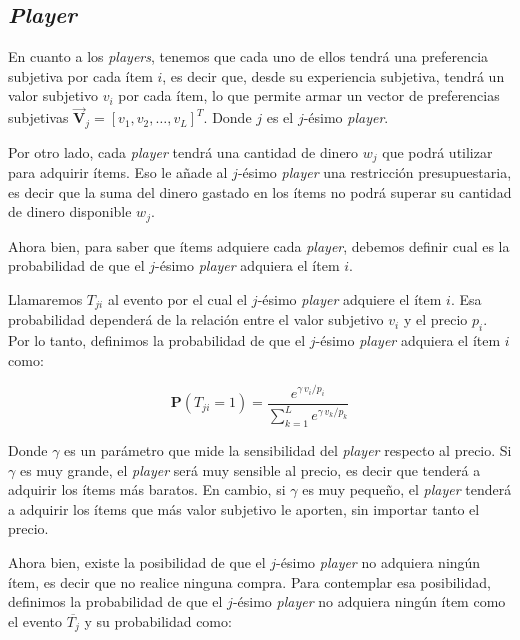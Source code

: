 \subsection{\textit{Player}}
\vspace{0.25cm}

En cuanto a los \textit{players}, tenemos que cada uno de ellos tendrá una preferencia subjetiva por cada ítem $i$, es
decir que, desde su experiencia subjetiva, tendrá un valor subjetivo $v_i$ por cada ítem, lo que permite armar un
vector de preferencias subjetivas $\vec{\mathbf{V}}_j = [v_1, v_2, \ldots, v_L]^T$. Donde $j$ es el $j$-ésimo 
\textit{player}.
\vspace{0.25cm}

Por otro lado, cada \textit{player} tendrá una cantidad de dinero $w_j$ que podrá utilizar para adquirir ítems. Eso le
añade al $j$-ésimo \textit{player} una restricción presupuestaria, es decir que la suma del dinero gastado en los ítems no 
podrá superar su cantidad de dinero disponible $w_j$.
\vspace{0.25cm}

Ahora bien, para saber que ítems adquiere cada \textit{player}, debemos definir cual es la probabilidad de que el
$j$-ésimo \textit{player} adquiera el ítem $i$. 
\vspace{0.25cm}

Llamaremos $T_{ji}$ al evento por el cual el $j$-ésimo \textit{player} adquiere el 
ítem $i$. Esa probabilidad dependerá de la relación entre el valor subjetivo $v_i$ y el precio $p_i$. Por lo tanto,
definimos la probabilidad de que el $j$-ésimo \textit{player} adquiera el ítem $i$ como:
\vspace{0.25cm}

\begin{equation}
  \mathbf{P}(T_{ji}=1) = \frac{e^{\gamma\, v_i / p_i}}{\sum_{k=1}^{L} e^{\gamma\, v_k / p_k}}
\end{equation}
\vspace{0.25cm}

Donde $\gamma$ es un parámetro que mide la sensibilidad del \textit{player} respecto al precio. Si $\gamma$ es muy 
grande, el \textit{player} será muy sensible al precio, es decir que tenderá a adquirir los ítems más baratos. En 
cambio, si $\gamma$ es muy pequeño, el \textit{player} tenderá a adquirir los ítems que más valor subjetivo le aporten, 
sin importar tanto el precio.
\vspace{0.25cm}

Ahora bien, existe la posibilidad de que el $j$-ésimo \textit{player} no adquiera ningún ítem, es decir que no realice ninguna 
compra. Para contemplar esa posibilidad, definimos la probabilidad de que el $j$-ésimo \textit{player} no adquiera ningún ítem 
como el evento $\overline{T_{j}}$ y su probabilidad como:
\vspace{0.25cm}

